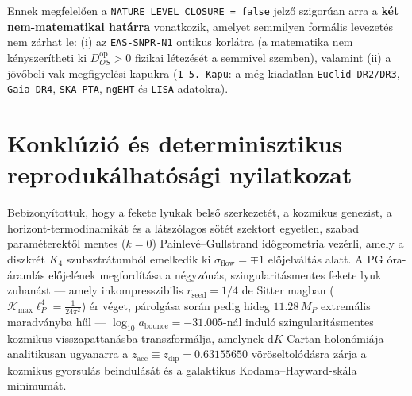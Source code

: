 \documentclass[11pt,a4paper]{article}
\theoremstyle{remark}
\begin{document}
Ennek megfelel\H{o}en a \texttt{NATURE\_\allowbreak LEVEL\_\allowbreak CLOSURE = false} jelz\H{o} szigor\'uan arra a \textbf{k\'et nem-matematikai hat\'arra} vonatkozik, amelyet semmilyen form\'alis levezet\'es nem z\'arhat le: (i) az \texttt{EAS-SNPR-N1} ontikus korl\'atra (a matematika nem k\'enyszer\'itheti ki $D_{OS}^{\mathrm{op}} > 0$ fizikai l\'etez\'es\'et a semmivel szemben), valamint (ii) a j\"ov\H{o}beli vak megfigyel\'esi kapukra (\texttt{1--5.\ Kapu}: a m\'eg kiadatlan \texttt{Euclid DR2/DR3}, \texttt{Gaia DR4}, \texttt{SKA-PTA}, \texttt{ngEHT} \'es \texttt{LISA} adatokra).

\section{Konkl\'uzi\'o \'es determinisztikus reproduk\'alhat\'os\'agi nyilatkozat}
\label{sec:conclusion}

Bebizony\'itottuk, hogy a fekete lyukak bels\H{o} szerkezet\'et, a kozmikus genezist, a horizont-termodinamik\'at \'es a l\'atsz\'olagos s\"ot\'et szektort egyetlen, szabad param\'eterekt\H{o}l mentes ($k = 0$) Painlev\'e--Gullstrand id\H{o}geometria vez\'erli, amely a diszkr\'et $K_4$ szubsztr\'atumb\'ol emelkedik ki $\sigma_{\mathrm{flow}} = \mp 1$ el\H{o}jelv\'alt\'as alatt. A PG \'ora-\'araml\'as el\H{o}jel\'enek megford\'it\'asa a n\'egyz\'on\'as, szingularit\'asmentes fekete lyuk zuhan\'ast --- amely inkompresszibilis $r_{\mathrm{seed}} = 1/4$ de Sitter magban ($\mathcal{K}_{\max}\ell_P^4 = \frac{1}{24\pi^2}$) \'er v\'eget, p\'arolg\'asa sor\'an pedig hideg $11.28\,M_P$ extrem\'alis maradv\'anyba h\H{u}l --- $\log_{10} a_{\mathrm{bounce}} = -31.005$-n\'al indul\'o szingularit\'asmentes kozmikus visszapattan\'asba transzform\'alja, amelynek $\mathrm{d}K$ Cartan-holon\'omi\'aja analitikusan ugyanarra a $z_{\mathrm{acc}} \equiv z_{\mathrm{dip}} = 0.63155650$ v\"or\"oseltol\'od\'asra z\'arja a kozmikus gyorsul\'as beindul\'as\'at \'es a galaktikus Kodama--Hayward-sk\'ala minimum\'at.
\end{document}
